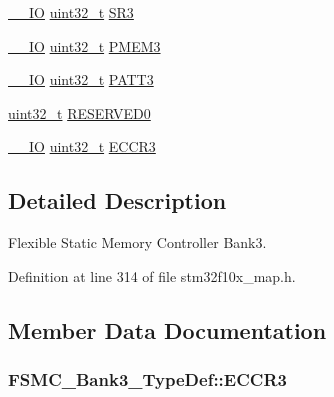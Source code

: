 \begin{DoxyCompactItemize}
\item 
\hyperlink{group___c_m_s_i_s___c_m3__core__definitions_gaec43007d9998a0a0e01faede4133d6be}{\+\_\+\+\_\+\+IO} \hyperlink{_p_e___types_8h_a33594304e786b158f3fb30289278f5af}{uint32\+\_\+t} \hyperlink{struct_f_s_m_c___bank3___type_def_ab89f16f64018a1f1e55d36f92b84be94}{S\+R3}
\item 
\hyperlink{group___c_m_s_i_s___c_m3__core__definitions_gaec43007d9998a0a0e01faede4133d6be}{\+\_\+\+\_\+\+IO} \hyperlink{_p_e___types_8h_a33594304e786b158f3fb30289278f5af}{uint32\+\_\+t} \hyperlink{struct_f_s_m_c___bank3___type_def_a756258d9266b1eee3455bc850107beb6}{P\+M\+E\+M3}
\item 
\hyperlink{group___c_m_s_i_s___c_m3__core__definitions_gaec43007d9998a0a0e01faede4133d6be}{\+\_\+\+\_\+\+IO} \hyperlink{_p_e___types_8h_a33594304e786b158f3fb30289278f5af}{uint32\+\_\+t} \hyperlink{struct_f_s_m_c___bank3___type_def_a0cbf1b4647f98914238202828de47416}{P\+A\+T\+T3}
\item 
\hyperlink{_p_e___types_8h_a33594304e786b158f3fb30289278f5af}{uint32\+\_\+t} \hyperlink{struct_f_s_m_c___bank3___type_def_a2e9cac528ee7bfce11b0b9a36db3b954}{R\+E\+S\+E\+R\+V\+E\+D0}
\item 
\hyperlink{group___c_m_s_i_s___c_m3__core__definitions_gaec43007d9998a0a0e01faede4133d6be}{\+\_\+\+\_\+\+IO} \hyperlink{_p_e___types_8h_a33594304e786b158f3fb30289278f5af}{uint32\+\_\+t} \hyperlink{struct_f_s_m_c___bank3___type_def_a6935beb5bbc2de668024c1989eecd46c}{E\+C\+C\+R3}
\end{DoxyCompactItemize}


\subsection{Detailed Description}
Flexible Static Memory Controller Bank3. 

Definition at line 314 of file stm32f10x\+\_\+map.\+h.



\subsection{Member Data Documentation}
\subsubsection[{\texorpdfstring{E\+C\+C\+R3}{ECCR3}}]{ F\+S\+M\+C\+\_\+\+Bank3\+\_\+\+Type\+Def\+::\+E\+C\+C\+R3}\hypertarget{struct_f_s_m_c___bank3___type_def_afc5b0fe7006a18a0b0c546a116c6433f}{}\label{struct_f_s_m_c___bank3___type_def_afc5b0fe7006a18a0b0c546a116c6433f}


